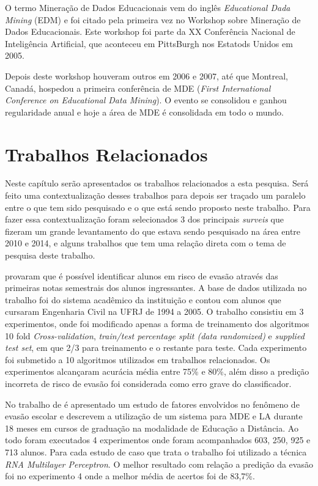 \documentclass[diss,capa]{texufpel}
\begin{document}
    O termo Mineração de Dados Educacionais vem do inglês \textit{Educational Dada Mining} (EDM) e foi citado pela primeira vez no Workshop sobre Mineração de Dados Educacionais.
    Este workshop foi parte da XX Conferência Nacional de Inteligência Artificial, que aconteceu em PittsBurgh nos Estatods Unidos em 2005.

    Depois deste workshop houveram outros em 2006 e 2007, até que Montreal, Canadá, hospedou a primeira conferência de MDE (\textit{First International Conference on Educational Data Mining}).
    O evento se consolidou e ganhou regularidade anual e hoje a área de MDE é consolidada em todo o mundo.



\chapter{Trabalhos Relacionados}

    Neste capítulo serão apresentados os trabalhos relacionados a esta pesquisa.
    Será feito uma contextualização desses trabalhos para depois ser traçado um paralelo entre o que tem sido pesquisado e o que está sendo proposto neste trabalho.
    Para fazer essa contextualização foram selecionados 3 dos principais \textit{surveis} que fizeram um grande levantamento do que estava sendo pesquisado na área entre 2010 e 2014, e alguns trabalhos que tem uma relação direta com o tema de pesquisa deste trabalho.

    
    \citealp{Manhaes2011} provaram que é possível identificar alunos em risco de evasão através das primeiras notas semestrais dos alunos ingressantes.
    A base de dados utilizada no trabalho foi do sistema acadêmico da instituição e contou com alunos que cursaram Engenharia Civil na UFRJ de 1994 a 2005.
    O trabalho consistiu em 3 experimentos, onde foi modificado apenas a forma de treinamento dos algoritmos 10 fold \textit{Cross-validation}, \textit{train/test percentage split (data randomized)} e \textit{supplied test set}, em que 2/3 para treinamento e o restante para teste.
    Cada experimento foi submetido a 10 algoritmos utilizados em trabalhos relacionados.
    Os experimentos alcançaram acurácia média entre 75\% e 80\%, além disso a predição incorreta de risco de evasão foi considerada como erro grave do classificador.

    No trabalho de \citealp{rigo2014aplicaccoes} é apresentado um estudo de fatores envolvidos no fenômeno de evasão escolar e descrevem a utilização de um sistema para MDE e LA durante 18 meses em cursos de graduação na modalidade de Educação a Distância.
    Ao todo foram executados 4 experimentos onde foram acompanhados 603, 250, 925 e 713 alunos.
    Para cada estudo de caso que trata o trabalho foi utilizado a técnica \textit{RNA Multilayer Perceptron}.
    O melhor resultado com relação a predição da evasão foi no experimento 4 onde a melhor média de acertos foi de 83,7\%.
\end{document}
